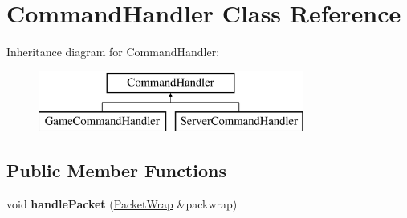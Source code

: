 \hypertarget{class_command_handler}{\section{Command\-Handler Class Reference}
\label{class_command_handler}
}
Inheritance diagram for Command\-Handler\-:\begin{figure}[H]
\begin{center}
\leavevmode
\includegraphics[height=2.000000cm]{class_command_handler}
\end{center}
\end{figure}
\subsection*{Public Member Functions}
\begin{DoxyCompactItemize}
\item 
\hypertarget{class_command_handler_a096eee4929c6cb8fa35c6c9756649d3e}{void {\bfseries handle\-Packet} (\hyperlink{struct_packet_wrap}{Packet\-Wrap} \&packwrap)}\label{class_command_handler_a096eee4929c6cb8fa35c6c9756649d3e}

\end{DoxyCompactItemize}
